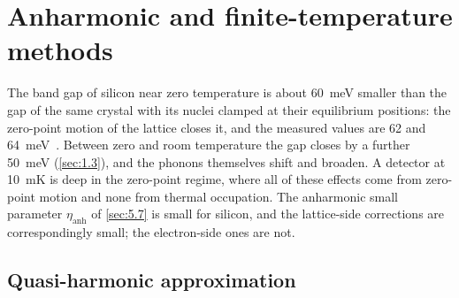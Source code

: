 \section{Anharmonic and finite-temperature methods}\label{app:E.8}

The band gap of silicon near zero temperature is about \SI{60}{meV} smaller than the gap of the same crystal with its nuclei clamped at their equilibrium positions: the zero-point motion of the lattice closes it, and the measured values are 62 and \SI{64}{meV}~\cite[Table~VI]{ponce2015temperature}. Between zero and room temperature the gap closes by a further \SI{50}{meV} (\cref{sec:1.3}), and the phonons themselves shift and broaden. A detector at \SI{10}{mK} is deep in the zero-point regime, where all of these effects come from zero-point motion and none from thermal occupation. The anharmonic small parameter $\eta_{\mathrm{anh}}$ of \cref{sec:5.7} is small for silicon, and the lattice-side corrections are correspondingly small; the electron-side ones are not.

\subsection{Quasi-harmonic approximation}

